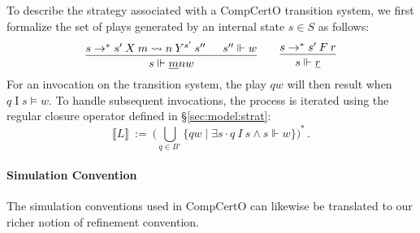 \documentclass[acmsmall,screen,review,nonacm]{acmart}
\newcommand{\kw}[1]{\ensuremath{ \mathsf{#1} }}
\newcommand{\que}{\circ}
\begin{document}

To describe the strategy associated with a CompCertO transition system,
we first formalize the set of plays generated by an internal state $s \in S$ as follows:
\[
  \begin{prooftree}
    \hypo{s \rightarrow^* s' \: X \: m \leadsto n \: Y^{s'} \: s''}
    \hypo{s'' \Vdash w}
    \infer2{s \Vdash \underline{m}nw}
  \end{prooftree}
  \qquad
  \begin{prooftree}
    \hypo{s \rightarrow^* s' \: F \: r}
    \infer1{s \Vdash \underline{r}}
  \end{prooftree}
\]
For an invocation on the transition system,
the play $qw$ will then result when $q \mathrel{I} s \vDash w$.
To handle subsequent invocations,
the process is iterated using the regular closure operator
defined in \S\ref{sec:model:strat}:
\[
  \llbracket L \rrbracket \: := \:
  \Big(\bigcup_{q \in B^\que} \{ qw \mid \exists s \cdot q \: I \: s \wedge s \Vdash w \} \Big)^*
  \,.
\]

\paragraph{Simulation Convention}

The simulation conventions used in CompCertO
can likewise be translated to our richer notion of
refinement convention.

\end{document}
